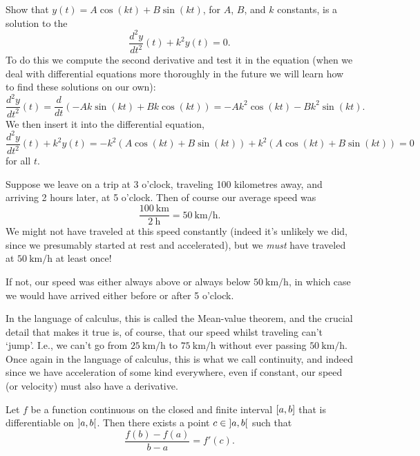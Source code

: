 \begin{example}
	Show that $y(t) = A \cos(k t) + B \sin(k t)$, for $A$, $B$, and $k$ constants, is a solution to the 
	\[
		\frac{d^2 y}{d t^2} (t) + k^2 y(t) = 0.
	\]
	To do this we compute the second derivative and test it in the equation (when we deal with differential equations more thoroughly in the future we will learn how to find these solutions on our own):
	\[
		\frac{d^2 y}{d t^2}(t) = \frac{d}{d t} (-A k \sin(k t) + B k \cos(k t)) = -A k^2 \cos(k t) - B k^2 \sin(k t).
	\]
	We then insert it into the differential equation,
	\[
		\frac{d^2 y}{d t^2} (t) + k^2 y(t) = - k^2 (A \cos(k t) + B \sin(k t)) + k^2 (A \cos(k t) + B \sin(k t)) = 0
	\]
	for all $t$.
\end{example}


\begin{example}
	Suppose we leave on a trip at 3 o'clock, traveling 100 kilometres away, and arriving 2 hours later, at 5 o'clock.
	Then of course our average speed was
	\[
		\frac{\SI{100}{\kilo\metre}}{\SI{2}{\hour}} = \SI[per-mode = symbol]{50}{\kilo\metre\per\hour}.
	\]
	We might not have traveled at this speed constantly (indeed it's unlikely we did, since we presumably started at rest and accelerated), but we \emph{must} have traveled at $\SI[per-mode = symbol]{50}{\kilo\metre\per\hour}$ at least once!

	If not, our speed was either always above or always below $\SI[per-mode = symbol]{50}{\kilo\metre\per\hour}$, in which case we would have arrived either before or after 5 o'clock.
\end{example}

\noindent
In the language of calculus, this is called the Mean-value theorem, and the crucial detail that makes it true is, of course, that our speed whilst traveling can't `jump'.
I.e., we can't go from $\SI[per-mode = symbol]{25}{\kilo\metre\per\hour}$ to $\SI[per-mode = symbol]{75}{\kilo\metre\per\hour}$ without ever passing $\SI[per-mode = symbol]{50}{\kilo\metre\per\hour}$.
Once again in the language of calculus, this is what we call continuity, and indeed since we have acceleration of some kind everywhere, even if constant, our speed (or velocity) must also have a derivative.

\begin{theorem}
	Let $f$ be a function continuous on the closed and finite interval $\interval{a}{b}$ that is differentiable on $\interval[open]{a}{b}$.
	Then there exists a point $c \in \interval[open]{a}{b}$ such that
	\[
		\frac{f(b) - f(a)}{b - a} = f'(c).
	\]
\end{theorem}

